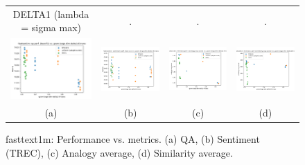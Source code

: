 \begin{figure}
\begin{tabular}{@{\hskip -0.0in}c@{\hskip -0.0in}c@{\hskip -0.0in}c@{\hskip -0.0in}c@{\hskip -0.0in}}
		DELTA1 (lambda = sigma max) & . & . & . \\
		\includegraphics[width=.245\linewidth]{figures/fasttext1m_qa_best-f1_vs_gram-large-dim-delta1-6-trans_linx.pdf} &
		\includegraphics[width=.245\linewidth]{figures/fasttext1m_sentiment_trec_test-acc_vs_gram-large-dim-delta1-6-trans_linx.pdf} &
		\includegraphics[width=.245\linewidth]{figures/fasttext1m_intrinsics_analogy-avg-score_vs_gram-large-dim-delta1-6-trans_linx.pdf} &
		\includegraphics[width=.245\linewidth]{figures/fasttext1m_intrinsics_similarity-avg-score_vs_gram-large-dim-delta1-6-trans_linx.pdf} \\		
		
		\;\;\;\;\;(a) & \;\;\;\;\;\;(b) & \;\;\;\;\;\;(c) & \;\;\;\;\;\;(d)
	\end{tabular}
	\caption{fasttext1m: Performance vs. metrics. (a) QA, (b) Sentiment (TREC), (c) Analogy average, (d) Similarity average.
	}
	\label{fig:fasttext1m_comparison_results}
\end{figure}




